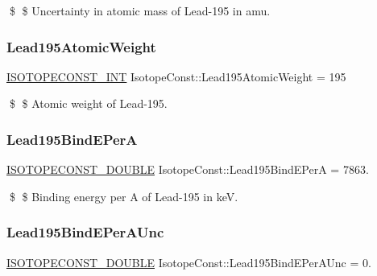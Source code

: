 \$ \$ Uncertainty in atomic mass of Lead-\/195 in amu. \mbox{\label{group___isotope_const-_lead-_pb195_ga634fa5232718b6acd59726affbbf0912}} 
\subsubsection{\texorpdfstring{Lead195\+Atomic\+Weight}{Lead195AtomicWeight}}
{\footnotesize\ttfamily \mbox{\hyperlink{group___isotope_const-_macros_ga5f18360b3e99483a35c32d789e62621c}{I\+S\+O\+T\+O\+P\+E\+C\+O\+N\+S\+T\+\_\+\+I\+NT}} Isotope\+Const\+::\+Lead195\+Atomic\+Weight = 195}

\$ \$ Atomic weight of Lead-\/195. \mbox{\label{group___isotope_const-_lead-_pb195_gabffd27fb156fa39f208c9a9bc2508884}} 
\subsubsection{\texorpdfstring{Lead195\+Bind\+E\+PerA}{Lead195BindEPerA}}
{\footnotesize\ttfamily \mbox{\hyperlink{group___isotope_const-_macros_ga8f45a7272ce02c0b4c65c44636ed719a}{I\+S\+O\+T\+O\+P\+E\+C\+O\+N\+S\+T\+\_\+\+D\+O\+U\+B\+LE}} Isotope\+Const\+::\+Lead195\+Bind\+E\+PerA = 7863.}

\$ \$ Binding energy per A of Lead-\/195 in keV. \mbox{\label{group___isotope_const-_lead-_pb195_gad4bc3276d0b6f9aa71a947d1cf885946}} 
\subsubsection{\texorpdfstring{Lead195\+Bind\+E\+Per\+A\+Unc}{Lead195BindEPerAUnc}}
{\footnotesize\ttfamily \mbox{\hyperlink{group___isotope_const-_macros_ga8f45a7272ce02c0b4c65c44636ed719a}{I\+S\+O\+T\+O\+P\+E\+C\+O\+N\+S\+T\+\_\+\+D\+O\+U\+B\+LE}} Isotope\+Const\+::\+Lead195\+Bind\+E\+Per\+A\+Unc = 0.}

